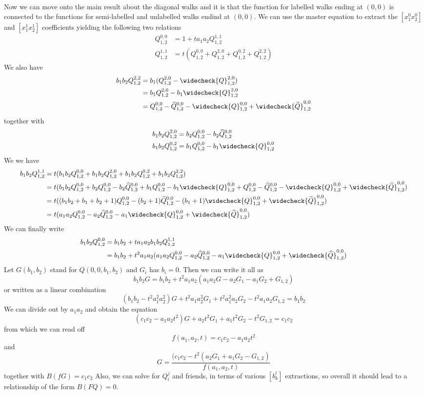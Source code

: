 \documentclass[12pt]{article}
\theoremstyle{definition} \newtheorem{definition}[theorem]{Definition}
\newcommand{\Qf}[1]{Q_{1,2}^{#1}}
\newcommand{\wh}{\widehat}
\newcommand{\wc}{\widecheck}
\begin{document}
Now we can move onto the main result about the diagonal walks and it is that the function for labelled walks ending at $(0,0)$ is connected to the functions for semi-labelled and unlabelled walks endind at $(0,0)$. We can use the master equation to extract the $[x_1^0x_2^0]$ and $[x_1^1x_2^1]$ coefficients yielding the following two relations
\begin{align*}
\Qf{0,0} &= 1 + ta_1a_2 \Qf{1,1}\\
\Qf{1,1} &= t(\Qf{0,0}+\Qf{2,0}+\Qf{0,2}+\Qf{2,2})
\end{align*}
We also have
\begin{align*}
b_1b_2\Qf{2,2} &= b_1(\Qf{2,0}-\wc{Q}_{1,2}^{2,0})\\
&= b_1 \Qf{2,0} - b_1\wc{Q}_{1,2}^{2,0}\\
&= \Qf{0,0}-\wh{Q}_{1,2}^{0,0}-\wc{Q}_{1,2}^{0,0}+\wc{\wh{Q}}_{1,2}^{0,0}
\end{align*}
together with
\begin{align*}
b_1b_2\Qf{2,0} &= b_2 \Qf{0,0} - b_2 \wh{Q}_{1,2}^{0,0}\\
b_1b_2\Qf{0,2} &= b_1 \Qf{0,0} - b_1 \wc{Q}_{1,2}^{0,0}
\end{align*}
We we have
\begin{align*}
b_1b_2\Qf{1,1} &= t(b_1b_2\Qf{0,0}+b_1b_2\Qf{2,0}+b_1b_2\Qf{0,2}+b_1b_2\Qf{2,2})\\
&= t(b_1b_2\Qf{0,0}+ b_2 \Qf{0,0} - b_2 \wh{Q}_{1,2}^{0,0}+ b_1 \Qf{0,0} - b_1 \wc{Q}_{1,2}^{0,0}+\Qf{0,0}-\wh{Q}_{1,2}^{0,0}-\wc{Q}_{1,2}^{0,0}+\wc{\wh{Q}}_{1,2}^{0,0})\\
&= t((b_1b_2+b_1+b_2+1)\Qf{0,0}-(b_2+1)\wh{Q}_{1,2}^{0,0}-(b_1+1)\wc{Q}_{1,2}^{0,0}+\wc{\wh{Q}}_{1,2}^{0,0})\\
&=t(a_1a_2\Qf{0,0}-a_2\wh{Q}_{1,2}^{0,0}-a_1\wc{Q}_{1,2}^{0,0}+\wc{\wh{Q}}_{1,2}^{0,0})
\end{align*}
We can finally write
\begin{align*}
b_1b_2\Qf{0,0} &= b_1b_2 + ta_1a_2b_1b_2\Qf{1,1}\\
& =  b_1b_2 + t^2a_1a_2(a_1a_2\Qf{0,0}-a_2\wh{Q}_{1,2}^{0,0}-a_1\wc{Q}_{1,2}^{0,0}+\wc{\wh{Q}}_{1,2}^{0,0})
\end{align*}
Let $G(b_1,b_2)$ stand for $Q(0,0,b_1,b_2)$ and $G_i$ has $b_i = 0$. Then we can write it all as
\[
   b_1b_2 G = b_1b_2 + t^2a_1a_2(a_1a_2G-a_2G_1-a_1G_2+G_{1,2})
\]
or written as a linear combination
\[
   (b_1b_2-t^2a_1^2a_2^2)G+t^2a_1a_2^2G_1 + t^2a_1^2a_2G_2 - t^2a_1a_2G_{1,2} = b_1b_2
\]
We can divide out by $a_1a_2$ and obtain the equation
\[
    (c_1c_2-a_1a_2t^2)G + a_2t^2G_1+a_1t^2G_2-t^2G_{1,2}=c_1c_2
\]
from which we can read off
\[
	f(a_1,a_2,t) = c_1c_2-a_1a_2t^2
\]
and
\[
    G = \frac{(c_1c_2-t^2(a_2G_1+a_1G_2-G_{1,2})}{f(a_1,a_2,t)}
\]
together with $B(fG) = c_1c_2$
Also, we can solve for $Q_i^j$ and friends, in terms of various $[b_k^l]$ extractions, so overall it should lead to a relationship of the form $B(FQ) = 0$.
\end{document}
